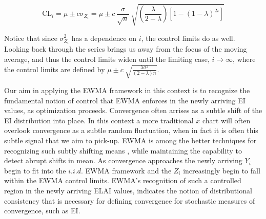 \documentclass{article}
\begin{document}
%
%
\begin{equation}
\text{CL}_i = \mu \pm c \sigma_{Z_i}
=  \mu \pm c ~ \frac{\sigma}{\sqrt{n}}~\sqrt{\left(\frac{\lambda}{2-\lambda}\right)\left[1-(1-\lambda)^{2i}\right]}
\label{EWMACL}
\end{equation}
%
%

%
Notice that since $\sigma^2_{Z_i}$ has a dependence on $i$, the control limits do as well.
Looking back through the series brings us away from the focus of the moving average, %
and thus the control limits widen until the limiting case, $i\rightarrow\infty$, 
where the control limits are defined by $\mu \pm c ~ \sqrt{\frac{\lambda\sigma^2}{(2-\lambda)n}}$.

%
Our aim in applying the EWMA framework in this context is to recognize the 
fundamental notion of control that EWMA enforces in the newly arriving EI 
values, as optimization proceeds. Convergence often arrises as a subtle shift 
of the EI distribution into place. In this context a more traditional $\bar x$ 
chart will often overlook convergence as a subtle random fluctuation, when in 
fact it is often this subtle signal that we aim to pick-up. EWMA is among the 
better techniques for recognizing such subtly shifting means \cite{aerne1991trend,zou2009compare}, 
while maintaining the capability to detect abrupt shifts in mean. As 
convergence approaches the newly arriving $Y_i$ begin to fit into the $i.i.d.$ 
EWMA framework and the $Z_i$ increasingly begin to fall within the EWMA 
control limits. EWMA's recognition of such a controlled region in the newly 
arriving ELAI values, indicates the notion of distributional consistency that 
is necessary for defining convergence for stochastic measures of convergence, 
such as EI. 



\end{document}
